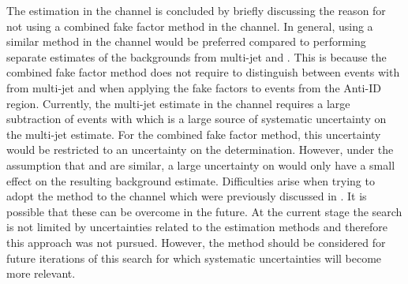 The \faketauhadvis estimation in the \lephad channel is concluded by briefly
discussing the reason for not using a combined fake factor method in the \hadhad
channel. In general, using a similar method in the \hadhad channel would be
preferred compared to performing separate estimates of the \faketauhadvis
backgrounds from multi-jet and \ttbar.  This is because the combined fake factor
method does not require to distinguish between events with \faketauhadvis from
multi-jet and \ttbar when applying the fake factors to events from the Anti-ID
region. Currently, the multi-jet estimate in the \hadhad channel requires a
large subtraction of \ttbar events with \faketauhadvis which is a large source
of systematic uncertainty on the multi-jet estimate. For the combined fake
factor method, this uncertainty would be restricted to an uncertainty on the
\rqcd determination. However, under the assumption that \FFqcd and \FFttbar are
similar, a large uncertainty on \rqcd would only have a small effect on the
resulting \faketauhadvis background estimate. Difficulties arise when trying to
adopt the method to the \hadhad channel which were previously discussed in
. It is possible that these can be overcome in
the future. At the current stage the search is not limited by uncertainties
related to the \faketauhadvis estimation methods and therefore this approach was
not pursued. However, the method should be considered for future iterations of
this search for which systematic uncertainties will become more relevant.


